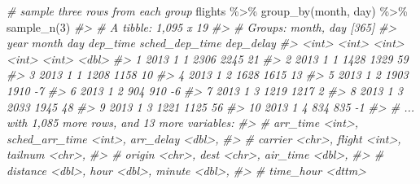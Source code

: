 \documentclass[
]{book}
\newenvironment{Shaded}{\begin{snugshade}}{\end{snugshade}}
\newcommand{\CommentTok}[1]{\textcolor[rgb]{0.56,0.35,0.01}{\textit{#1}}}
\newcommand{\DecValTok}[1]{\textcolor[rgb]{0.00,0.00,0.81}{#1}}
\newcommand{\FunctionTok}[1]{\textcolor[rgb]{0.00,0.00,0.00}{#1}}
\newcommand{\NormalTok}[1]{#1}
\newcommand{\SpecialCharTok}[1]{\textcolor[rgb]{0.00,0.00,0.00}{#1}}
\begin{document}
\begin{Shaded}
\begin{Highlighting}[]
\CommentTok{\# sample three rows from each group}
\NormalTok{flights }\SpecialCharTok{\%\textgreater{}\%} \FunctionTok{group\_by}\NormalTok{(month, day) }\SpecialCharTok{\%\textgreater{}\%} \FunctionTok{sample\_n}\NormalTok{(}\DecValTok{3}\NormalTok{)}
\CommentTok{\#\textgreater{} \# A tibble: 1,095 x 19}
\CommentTok{\#\textgreater{} \# Groups:   month, day [365]}
\CommentTok{\#\textgreater{}     year month   day dep\_time sched\_dep\_time dep\_delay}
\CommentTok{\#\textgreater{}    \textless{}int\textgreater{} \textless{}int\textgreater{} \textless{}int\textgreater{}    \textless{}int\textgreater{}          \textless{}int\textgreater{}     \textless{}dbl\textgreater{}}
\CommentTok{\#\textgreater{}  1  2013     1     1     2306           2245        21}
\CommentTok{\#\textgreater{}  2  2013     1     1     1428           1329        59}
\CommentTok{\#\textgreater{}  3  2013     1     1     1208           1158        10}
\CommentTok{\#\textgreater{}  4  2013     1     2     1628           1615        13}
\CommentTok{\#\textgreater{}  5  2013     1     2     1903           1910        {-}7}
\CommentTok{\#\textgreater{}  6  2013     1     2      904            910        {-}6}
\CommentTok{\#\textgreater{}  7  2013     1     3     1219           1217         2}
\CommentTok{\#\textgreater{}  8  2013     1     3     2033           1945        48}
\CommentTok{\#\textgreater{}  9  2013     1     3     1221           1125        56}
\CommentTok{\#\textgreater{} 10  2013     1     4      834            835        {-}1}
\CommentTok{\#\textgreater{} \# ... with 1,085 more rows, and 13 more variables:}
\CommentTok{\#\textgreater{} \#   arr\_time \textless{}int\textgreater{}, sched\_arr\_time \textless{}int\textgreater{}, arr\_delay \textless{}dbl\textgreater{},}
\CommentTok{\#\textgreater{} \#   carrier \textless{}chr\textgreater{}, flight \textless{}int\textgreater{}, tailnum \textless{}chr\textgreater{},}
\CommentTok{\#\textgreater{} \#   origin \textless{}chr\textgreater{}, dest \textless{}chr\textgreater{}, air\_time \textless{}dbl\textgreater{},}
\CommentTok{\#\textgreater{} \#   distance \textless{}dbl\textgreater{}, hour \textless{}dbl\textgreater{}, minute \textless{}dbl\textgreater{},}
\CommentTok{\#\textgreater{} \#   time\_hour \textless{}dttm\textgreater{}}


\end{Highlighting}
\end{Shaded}
\end{document}
